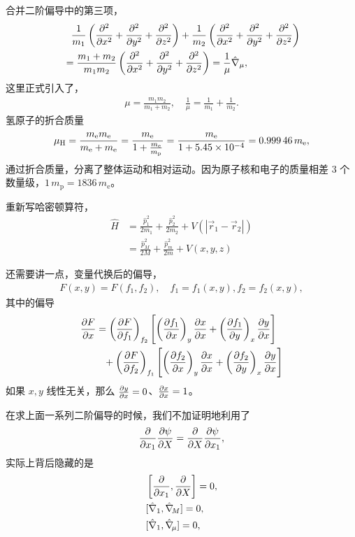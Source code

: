 合并二阶偏导中的第三项，
\begin{align}
    &\phantom{=}\frac1{m_1} \left(\pdv[2]x + \pdv[2]y + \pdv[2]z\right) +
    \frac1{m_2} \left(\pdv[2]x + \pdv[2]y + \pdv[2]z\right) \\
    &= \frac{m_1 + m_2}{m_1 m_2} \left(
        \pdv[2]x + \pdv[2]y + \pdv[2]z
    \right) = \frac{1}{\mu} \hat \nabla_\mu,
\end{align}
这里正式引入了，
\begin{align}
    \mu = \frac{m_1m_2}{m_1 + m_2}, \quad \frac1{\mu}=\frac1{m_1} + \frac1{m_2}. 
\end{align}
氢原子的折合质量
\begin{align}
    \mu_{\mathrm H} = \frac{m_{\mathrm e} m_{\mathrm e}}{m_{\mathrm e}+m_{\mathrm e}} = \frac {m_{\mathrm e}} {1 + \frac{m_{\mathrm e}}{m_{\mathrm p}}} = \frac{m_{\mathrm e}}{1 + \num{5.45E-4}} = \num{0.99946} \,m_{\mathrm e}, 
\end{align}
通过折合质量，分离了整体运动和相对运动。因为原子核和电子的质量相差 3 个数量级，$1 \,m_{\mathrm p} = 1836 \,m_{\mathrm e}$。

重新写哈密顿算符，
\begin{align}
    \hat H &= \frac{\hat p_1^2}{2m_1} + \frac{\hat p_2^2}{2m_2} + V (|\vec r_1 - \vec r_2 |) \\
    &= \frac{\hat p_M^2}{2M} + \frac{\hat p_m^2}{2m} + V(x,y,z)
    \label{eq:hydro_cent_h}
\end{align}

还需要讲一点，变量代换后的偏导，
\begin{align}
    F(x,y) = F(f_1,f_2), \quad f_1=f_1(x,y), f_2=f_2(x,y),
\end{align}
其中的偏导
\begin{align}
    \pdv{F}{x} &= \left(\pdv{F}{f_1}\right)_{f_2} 
    \left[
        \left(\pdv{f_1}{x}\right)_y \pdv{x}{x}
        + \left(\pdv{f_1}{y}\right)_x \pdv{y}{x}
    \right] \notag\\
    &\phantom{=}
    +
    \left(\pdv{F}{f_2}\right)_{f_1}
    \left[
        \left(\pdv{f_2}{x}\right)_y \pdv{x}{x}
        + \left(\pdv{f_2}{y}\right)_x \pdv{y}{x}
    \right] 
\end{align}
如果 $x,y$ 线性无关，那么 $\pdv{y}{x} = 0$、$\pdv{x}{x} = 1$。

在求上面一系列二阶偏导的时候，我们不加证明地利用了
\begin{align}
    \pdv{x_1} \pdv{\psi}{X} = \pdv{X} \pdv{\psi}{x_1},
\end{align}
实际上背后隐藏的是
\begin{align}
    &\left[
        \pdv{x_1}, \pdv{X}
    \right] = 0, \\
    & [\hat \nabla_1, \hat \nabla\!_M] = 0,\\
    &[\hat \nabla_1, \hat \nabla\!_\mu] = 0,
\end{align}

